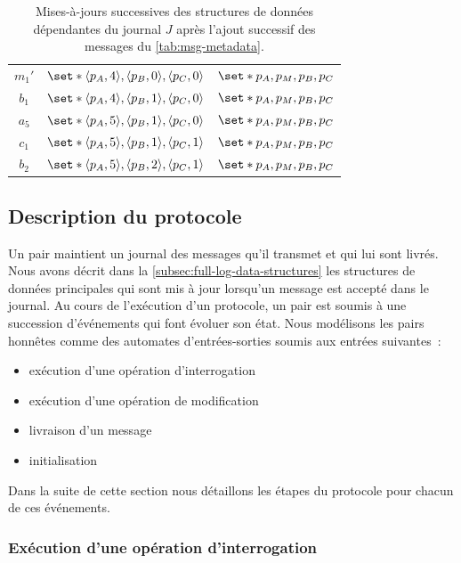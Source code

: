 \begin{table}[ht]
\begin{subtable}{\linewidth}
\begin{tabular}{ccc}
        $m_1'$ & $\set*{\tuple*{p_A, 4}, \tuple*{p_B, 0}, \tuple*{p_C, 0}}$ & $\set*{p_A,p_M,p_B,p_C}$ \\
        $b_1$ & $\set*{\tuple*{p_A, 4}, \tuple*{p_B, 1}, \tuple*{p_C, 0}}$ & $\set*{p_A,p_M,p_B,p_C}$ \\
        $a_5$ & $\set*{\tuple*{p_A, 5}, \tuple*{p_B, 1}, \tuple*{p_C, 0}}$ & $\set*{p_A,p_M,p_B,p_C}$ \\
        $c_1$ & $\set*{\tuple*{p_A, 5}, \tuple*{p_B, 1},\tuple*{p_C, 1}}$ & $\set*{p_A,p_M,p_B,p_C}$ \\
        $b_2$ & $\set*{\tuple*{p_A, 5}, \tuple*{p_B, 2}, \tuple*{p_C, 1}}$ & $\set*{p_A,p_M,p_B,p_C}$ \\
    \end{tabular}
    \end{subtable}
    \caption[Exemple de mises-à-jours de structures de données dépendantes d'un' journal]{Mises-à-jours successives des structures de données dépendantes du journal $J$ après l'ajout successif des messages du \autoref{tab:msg-metadata}.}\label{tab:data-structure-update}
\end{table}
 

\subsection{Description du protocole}

Un pair maintient un journal des messages qu'il transmet et qui lui sont livrés.
Nous avons décrit dans la \autoref{subsec:full-log-data-structures} les structures de données principales qui sont mis à jour lorsqu'un message est accepté dans le journal.
Au cours de l'exécution d'un protocole, un pair est soumis à une succession d'événements qui font évoluer son état.
Nous modélisons les pairs honnêtes comme des automates d'entrées-sorties soumis aux entrées suivantes~:
\begin{itemize}
    \item exécution d'une opération d'interrogation
    \item exécution d'une opération de modification
    \item livraison d'un message
    \item initialisation
\end{itemize}

Dans la suite de cette section nous détaillons les étapes du protocole pour chacun de ces événements.

\subsubsection{Exécution d'une opération d'interrogation}

